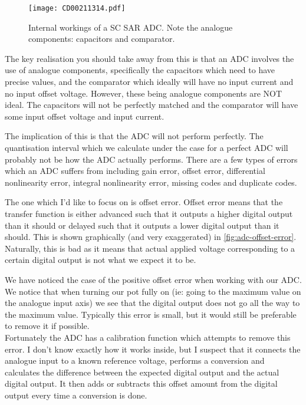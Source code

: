 \begin{figure}
\centering
\texttt{[image: CD00211314.pdf]}
\caption{Internal workings of a SC SAR ADC. Note the analogue components: capacitors and comparator.}
\label{fig:adc-component-level}
\end{figure}

The key realisation you should take away from this is that an ADC involves the use of analogue components, specifically the capacitors which need to have precise values, and the comparator which ideally will have no input current and no input offset voltage. However, these being analogue components are NOT ideal. The capacitors will not be perfectly matched and the comparator will have some input offset voltage and input current.

The implication of this is that the ADC will not perform perfectly. The quantisation interval which we calculate under the case for a perfect ADC will probably not be how the ADC actually performs.
There are a few types of errors which an ADC suffers from including gain error, offset error, differential nonlinearity error, integral nonlinearity error, missing codes and duplicate codes. 

The one which I'd like to focus on is offset error. Offset error means that the transfer function is either advanced such that it outputs a higher digital output than it should or delayed such that it outputs a lower digital output than it should. 
This is shown graphically (and very exaggerated) in \autoref{fig:adc-offset-error}. Naturally, this is bad as it means that actual applied voltage corresponding to a certain digital output is not what we expect it to be. 

We have noticed the case of the positive offset error when working with our ADC. We notice that when turning our pot fully on (ie: going to the maximum value on the analogue input axis) we see that the digital output does not go all the way to the maximum value. Typically this error is small, but it would still be preferable to remove it if possible.\\

Fortunately the ADC has a calibration function which attempts to remove this error. I don't know exactly how it works inside, but I suspect that it connects the analogue input to a known reference voltage, performs a conversion and calculates the difference between the expected digital output and the actual digital output. It then adds or subtracts this offset amount from the digital output every time a conversion is done.


